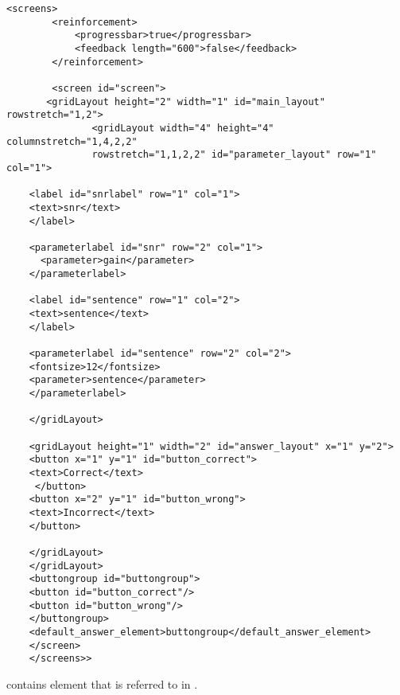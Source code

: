 


\begin{lstlisting}
<screens>
        <reinforcement>
            <progressbar>true</progressbar>
            <feedback length="600">false</feedback>
        </reinforcement>

        <screen id="screen">
       <gridLayout height="2" width="1" id="main_layout" rowstretch="1,2">
               <gridLayout width="4" height="4" columnstretch="1,4,2,2"
               rowstretch="1,1,2,2" id="parameter_layout" row="1" col="1">

    <label id="snrlabel" row="1" col="1">
    <text>snr</text>
    </label>

    <parameterlabel id="snr" row="2" col="1">
      <parameter>gain</parameter>
    </parameterlabel>

    <label id="sentence" row="1" col="2">
    <text>sentence</text>
    </label>

    <parameterlabel id="sentence" row="2" col="2">
    <fontsize>12</fontsize>
    <parameter>sentence</parameter>
    </parameterlabel>

    </gridLayout>

    <gridLayout height="1" width="2" id="answer_layout" x="1" y="2">
    <button x="1" y="1" id="button_correct">
    <text>Correct</text>
     </button>
    <button x="2" y="1" id="button_wrong">
    <text>Incorrect</text>
    </button>

    </gridLayout>
    </gridLayout>
    <buttongroup id="buttongroup">
    <button id="button_correct"/>
    <button id="button_wrong"/>
    </buttongroup>
    <default_answer_element>buttongroup</default_answer_element>
    </screen>
    </screens>>
\end{lstlisting}

 contains  element that is
referred to in .

